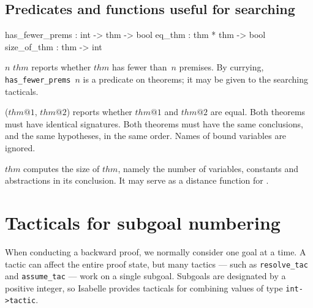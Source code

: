\subsection{Predicates and functions useful for searching}
\begin{ttbox} 
has_fewer_prems : int -> thm -> bool
eq_thm          : thm * thm -> bool
size_of_thm     : thm -> int
\end{ttbox}
\begin{ttdescription}
\item[\ttindexbold{has_fewer_prems} $n$ $thm$] 
reports whether $thm$ has fewer than~$n$ premises.  By currying,
\hbox{\tt has_fewer_prems $n$} is a predicate on theorems; it may 
be given to the searching tacticals.

\item[\ttindexbold{eq_thm} ($thm@1$, $thm@2$)] reports whether $thm@1$ and
  $thm@2$ are equal.  Both theorems must have identical signatures.  Both
  theorems must have the same conclusions, and the same hypotheses, in the
  same order.  Names of bound variables are ignored.

\item[\ttindexbold{size_of_thm} $thm$] 
computes the size of $thm$, namely the number of variables, constants and
abstractions in its conclusion.  It may serve as a distance function for 
. 
\end{ttdescription}



\section{Tacticals for subgoal numbering}
When conducting a backward proof, we normally consider one goal at a time.
A tactic can affect the entire proof state, but many tactics --- such as
{\tt resolve_tac} and {\tt assume_tac} --- work on a single subgoal.
Subgoals are designated by a positive integer, so Isabelle provides
tacticals for combining values of type {\tt int->tactic}.


